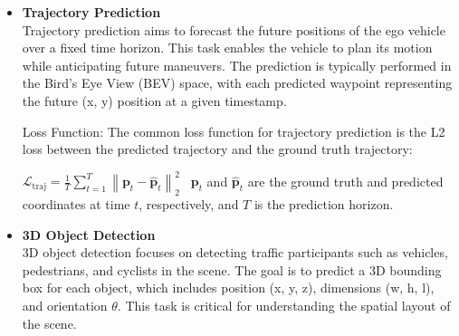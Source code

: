 \documentclass{article} %
\begin{document}
	\begin{itemize}
		\item \textbf{Trajectory Prediction} 
		\\
		Trajectory prediction aims to forecast the future positions of the ego vehicle over a fixed time horizon. This task enables the vehicle to plan its motion while anticipating future maneuvers. The prediction is typically performed in the Bird’s Eye View (BEV) space, with each predicted waypoint representing the future (x, y) position at a given timestamp.
		
		Loss Function:
		The common loss function for trajectory prediction is the L2 loss between the predicted trajectory and the ground truth trajectory:
		
		$\mathcal{L}_{\text{traj}} = \frac{1}{T} \sum_{t=1}^{T} \left\| \mathbf{p}_t - \hat{\mathbf{p}}_t \right\|_2^2 $ \ \(\mathbf{p}_t\) and \(\hat{\mathbf{p}}_t\) are the ground truth and predicted coordinates at time \(t\), respectively, and \(T\) is the prediction horizon.
		
		
		\item \textbf{3D Object Detection} 
		\\
		3D object detection focuses on detecting traffic participants such as vehicles, pedestrians, and cyclists in the scene. The goal is to predict a 3D bounding box for each object, which includes position (x, y, z), dimensions (w, h, l), and orientation $\theta$. This task is critical for understanding the spatial layout of the scene.
		

\end{itemize}
\end{document}
